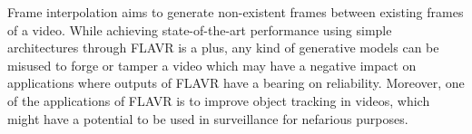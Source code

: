\documentclass[10pt,twocolumn,letterpaper]{article}
\newcommand{\Ours}{FLAVR}
\begin{document}
Frame interpolation aims to generate non-existent frames between existing frames of a video. While achieving state-of-the-art performance using simple architectures through \Ours{} is a plus, any kind of generative models can be misused to forge or tamper a video which may have a negative impact on applications where outputs of \Ours{} have a bearing on reliability. Moreover, one of the applications of \Ours{} is to improve object tracking in videos, which might have a potential to be used in surveillance for nefarious purposes. 




\end{document}
